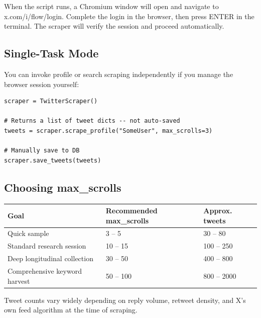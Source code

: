 \documentclass[11pt, a4paper]{article}
\newenvironment{infobox}[1][Info]{%
  \begin{tcolorbox}[enhanced, breakable,
    colback=TwLight, colframe=TwBlue,
    boxrule=0.8pt, arc=5pt,
    left=8pt, right=8pt, top=5pt, bottom=5pt,
    title={\textbf{#1}},
    fonttitle=\small\color{TwBlue},
    attach boxed title to top left={yshift=-2mm, xshift=8mm},
    boxed title style={colback=TwLight, colframe=TwBlue, arc=3pt}]
}{\end{tcolorbox}}
\def\texttt#1{#1}%
\def\color#1{}%
\begin{document}
\begin{infobox}[Login Flow]
When the script runs, a Chromium window will open and navigate to
\texttt{x.com/i/flow/login}. Complete the login in the browser, then press
\texttt{ENTER} in the terminal. The scraper will verify the session and proceed
automatically.
\end{infobox}
\newpage
\subsection{Single-Task Mode}

You can invoke profile or search scraping independently if you manage the
browser session yourself:

\begin{tcolorbox}[pybox, title=Single profile scrape]
\begin{lstlisting}[style=pycode]
scraper = TwitterScraper()

# Returns a list of tweet dicts -- not auto-saved
tweets = scraper.scrape_profile("SomeUser", max_scrolls=3)

# Manually save to DB
scraper.save_tweets(tweets)
\end{lstlisting}
\end{tcolorbox}

\subsection{Choosing \texttt{max\_scrolls}}

\begin{center}
\begin{tabular}{lll}
\toprule
\textbf{Goal}                    & \textbf{Recommended \texttt{max\_scrolls}} & \textbf{Approx. tweets} \\
\midrule
Quick sample                     & 3 -- 5     & 30 -- 80 \\
Standard research session        & 10 -- 15   & 100 -- 250 \\
Deep longitudinal collection     & 30 -- 50   & 400 -- 800 \\
Comprehensive keyword harvest    & 50 -- 100  & 800 -- 2000 \\
\bottomrule
\end{tabular}
\end{center}

Tweet counts vary widely depending on reply volume, retweet density,
and X's own feed algorithm at the time of scraping.
\end{document}

